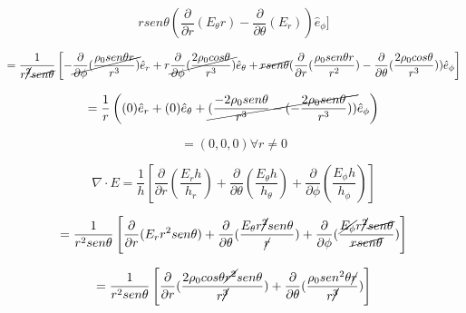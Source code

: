 \documentclass[12pt,a4paper]{article}
\begin{document}
\begin{enumerate}
    \begin{equation*}
         r sen \theta \left(\frac{\partial}{\partial r}(E_\theta r) - \frac{\partial}{\partial \theta} (E_r) \right) \hat{e}_\phi]
    \end{equation*}
    
    \begin{equation*}
        = \frac{1}{r\cancel{^2}\cancel{sen \theta}}\left[- \cancel{\frac{\partial}{\partial \phi} (\frac{\rho _0 sen \theta r}{r^3})} \hat{e}_r + r \cancel{\frac{\partial}{\partial \phi}(\frac{2 \rho _0 cos \theta}{r^3})} \hat{e}_\theta + \cancel{r sen \theta}(\frac{\partial}{\partial r}(\frac{\rho _0 sen \theta r}{r^2}) - \frac{\partial}{\partial \theta}(\frac{2 \rho _0 cos \theta}{r^3})) \hat{e}_\phi \right]
    \end{equation*}
    
    \begin{equation*}
        = \frac{1}{r} \left((0) \hat{e}_r + (0) \hat{e}_\theta + \cancel{(\frac{-2 \rho _0 sen \theta}{r^3} - (- \frac{2 \rho _0 sen \theta}{r^3}))} \hat{e}_\phi\right)
    \end{equation*}
    
    \begin{equation*}
        = (0, 0, 0)  \forall r \neq 0
    \end{equation*}
    
    \begin{equation*}
        \nabla \cdot E = \frac{1}{h} \left[\frac{\partial}{\partial r}(\frac{E_r h}{h_r}) + \frac{\partial}{\partial \theta}(\frac{E_\theta h}{h_\theta}) + \frac{\partial}{\partial \phi}(\frac{E_\phi h}{h_\phi}) \right]
    \end{equation*}
    
    \begin{equation*}
        = \frac{1}{r^2 sen \theta} \left[\frac{\partial}{\partial r}(E_r r^2 sen \theta) + \frac{\partial}{\partial \theta}(\frac{E_\theta r \cancel{^2}sen \theta}{\cancel{r}}) + \frac{\partial }{\partial \phi} (\frac{\cancel{E_\phi} r \cancel{^2} \cancel{sen \theta}}{\cancel{r sen \theta}})  \right]
    \end{equation*}
    
    \begin{equation*}
        = \frac{1}{r^2 sen \theta} \left[\frac{\partial}{\partial r}(\frac{2\rho _0 cos \theta \cancel{r^2}sen \theta}{r \cancel{^3}}) + \frac{\partial}{\partial \theta} (\frac{\rho _0 sen^2 \theta \cancel{r}}{r \cancel{^3}}) \right]
    \end{equation*}
    

\end{enumerate}
\end{document}
